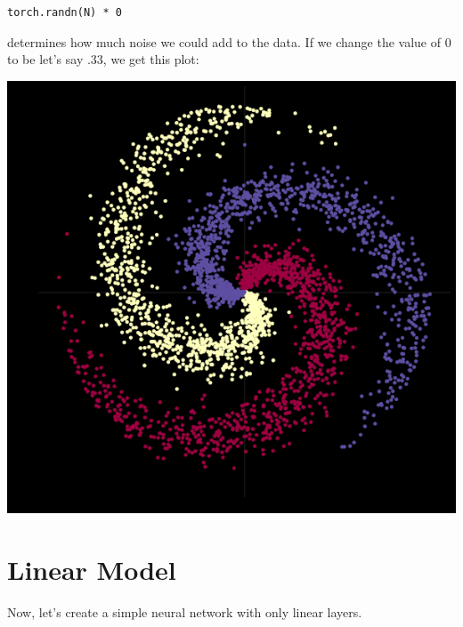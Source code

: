 \begin{verbatim}
torch.randn(N) * 0
\end{verbatim}

determines how much noise we could add to the data. 
If we change the value of 0 to be let's say .33, we get this plot: 

\begin{center}
	\includegraphics[width=0.5\linewidth]{lectures/03-a/images/data_noise.png} 
\end{center}


\section{Linear Model}

Now, let's create a simple neural network with only linear layers.


